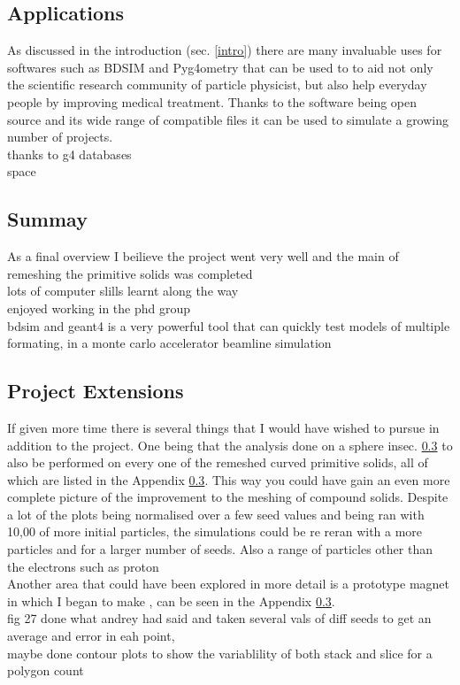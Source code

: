 \documentclass[12pt,a4paper]{article}
\begin{document}
\subsection{Applications}
As discussed in the introduction (sec. \ref{intro}) there are many invaluable uses for softwares such as BDSIM and Pyg4ometry that can be used to to aid not only the scientific research community of particle physicist, but also help everyday people by improving medical treatment. Thanks to the software being open source and its wide range of compatible files it can be used to simulate a growing number of projects. \\
thanks to g4 databases\\
space\\

\subsection{Summay}
As a final overview I beilieve the project went very well and the main of remeshing the primitive solids was completed\\
lots of computer slills learnt along the way\\
enjoyed working in the phd group\\
bdsim and geant4 is a very powerful tool that can quickly test models of multiple formating, in a monte carlo accelerator beamline simulation


\subsection{Project Extensions}
If given more time there is several things that I  would have wished to pursue in addition to the project. One being that the analysis done on a sphere insec. \ref{} to also be performed on every one of the remeshed curved primitive solids, all of which are listed in the Appendix \ref{}. This way you could have gain an even more complete picture of the improvement to the meshing of compound solids. Despite a lot of the plots being normalised over a few seed values and being ran with 10,00 of more initial particles, the simulations could be re reran with a more particles and for a larger number of seeds. Also a range of particles other than the electrons such as proton\\
Another area that could have been explored in more detail is a prototype magnet in which I began to make , can be seen in the Appendix \ref{}.\\
fig 27 done what andrey had said and taken several vals of diff seeds to get an average and error in eah point, \\
maybe done contour plots to show the variablility of both stack and slice for a polygon count\\
\end{document}
